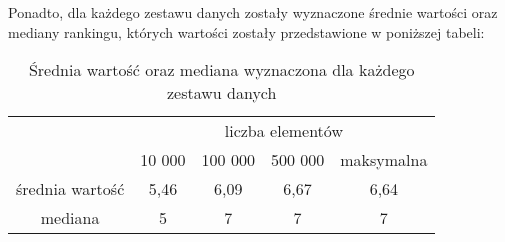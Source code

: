 Ponadto, dla każdego zestawu danych zostały wyznaczone średnie wartości oraz mediany rankingu, których wartości zostały przedstawione w poniższej tabeli:


\begin{table}[H]
    \centering
    \caption{Średnia wartość oraz mediana wyznaczona dla każdego zestawu danych}
    \label{tab: mediana_srednia}
    \begin{tabular}{c|cccc|}
    \cline{2-5}
                                          & \multicolumn{4}{c|}{liczba elementów}                                                                  \\ \cline{2-5} 
                                          & \multicolumn{1}{c|}{10 000} & \multicolumn{1}{c|}{100 000} & \multicolumn{1}{c|}{500 000} & maksymalna \\ \hline
    \multicolumn{1}{|c|}{średnia wartość} & \multicolumn{1}{c|}{5,46}   & \multicolumn{1}{c|}{6,09}    & \multicolumn{1}{c|}{6,67}    & 6,64       \\ \hline
    \multicolumn{1}{|c|}{mediana}         & \multicolumn{1}{c|}{5}      & \multicolumn{1}{c|}{7}       & \multicolumn{1}{c|}{7}       & 7          \\ \hline
    \end{tabular}
    \end{table}